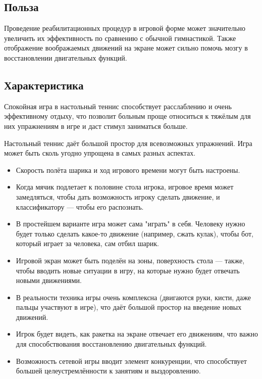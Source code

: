 \documentclass[a4paper,12pt]{article}
\begin{document}
\subsection*{Польза}

\noindent
Проведение реабилитационных процедур в игровой форме может значительно увеличить их эффективность по сравнению с обычной гимнастикой. Также отображение воображаемых движений на экране может сильно помочь мозгу в восстановлении двигательных функций.


\subsection*{Характеристика}

\noindent
Спокойная игра в настольный теннис способствует расслаблению и очень эффективному отдыху, что позволит больным проще относиться к тяжёлым для них упражнениям в игре и даст стимул заниматься больше.

\noindent
Настольный теннис даёт большой простор для всевозможных упражнений. Игра может быть сколь угодно упрощена в самых разных аспектах.

\begin{itemize}
    \item Скорость полёта шарика и ход игрового времени могут быть настроены.
    
    \item Когда мячик подлетает к половине стола игрока, игровое время может замедляться, чтобы дать возможность игроку сделать движение, и классификатору --- чтобы его распознать.
    
    \item  В простейшем варианте игра может сама "играть" в себя. Человеку нужно будет только сделать какое-то движение (например, сжать кулак), чтобы бот, который играет за человека, сам отбил шарик.
    
    \item Игровой экран может быть поделён на зоны, поверхность стола --- также, чтобы вводить новые ситуации в игру, на которые нужно будет отвечать новыми движениями.
    
    \item В реальности техника игры очень комплексна (двигаются руки, кисти, даже пальцы участвуют в игре), что даёт большой простор на введение новых движений.
    
    \item Игрок будет видеть, как ракетка на экране отвечает его движениям, что важно для способствования восстановлению двигательных функций.
    
    \item Возможность сетевой игры вводит элемент конкуренции, что способствует большей целеустремлённости к занятиям и выздоровлению.
\end{itemize}
\end{document}
